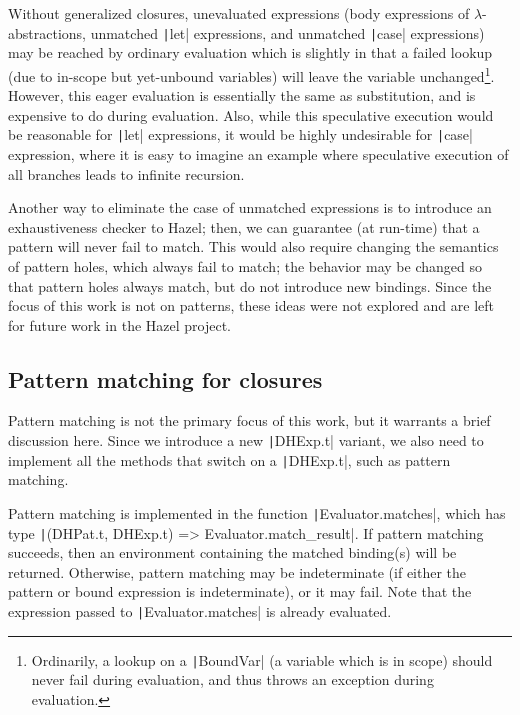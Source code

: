 Without generalized closures, unevaluated expressions (body expressions of $\lambda$-abstractions, unmatched \texttt|let| expressions, and unmatched \texttt|case| expressions) may be reached by ordinary evaluation which is slightly in that a failed lookup (due to in-scope but yet-unbound variables) will leave the variable unchanged\footnote{Ordinarily, a lookup on a \texttt|BoundVar| (a variable which is in scope) should never fail during evaluation, and thus throws an exception during evaluation.}. However, this eager evaluation is essentially the same as substitution, and is expensive to do during evaluation. Also, while this speculative execution would be reasonable for \texttt|let| expressions, it would be highly undesirable for \texttt|case| expression, where it is easy to imagine an example where speculative execution of all branches leads to infinite recursion.

Another way to eliminate the case of unmatched expressions is to introduce an exhaustiveness checker to Hazel; then, we can guarantee (at run-time) that a pattern will never fail to match. This would also require changing the semantics of pattern holes, which always fail to match; the behavior may be changed so that pattern holes always match, but do not introduce new bindings. Since the focus of this work is not on patterns, these ideas were not explored and are left for future work in the Hazel project.

\subsection{Pattern matching for closures}
\label{sec:generalized-closures-matching}

Pattern matching is not the primary focus of this work, but it warrants a brief discussion here. Since we introduce a new \texttt|DHExp.t| variant, we also need to implement all the methods that switch on a \texttt|DHExp.t|, such as pattern matching.

Pattern matching is implemented in the function \texttt|Evaluator.matches|, which has type \texttt|(DHPat.t, DHExp.t) => Evaluator.match_result|. If pattern matching succeeds, then an environment containing the matched binding(s) will be returned. Otherwise, pattern matching may be indeterminate (if either the pattern or bound expression is indeterminate), or it may fail. Note that the expression passed to \texttt|Evaluator.matches| is already evaluated.

